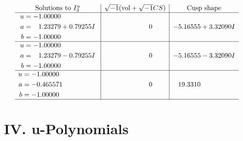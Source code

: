 \documentclass[1p]{elsarticle_modified}
\theoremstyle{definition}
\newcommand{\I}{\sqrt{-1}}
\begin{document}
$$\begin{array}{c|c|c}  
\text{Solutions to }I^u_{3}& \I (\text{vol} + \sqrt{-1}CS) & \text{Cusp shape}\\
 \hline 
\begin{aligned}
u &= -1.00000\phantom{ +0.000000I} \\
a &= \phantom{-}1.23279 + 0.79255 I \\
b &= -1.00000\phantom{ +0.000000I}\end{aligned}
 & \phantom{-0.000000 } 0 & -5.16555 + 3.32090 I \\ \hline\begin{aligned}
u &= -1.00000\phantom{ +0.000000I} \\
a &= \phantom{-}1.23279 - 0.79255 I \\
b &= -1.00000\phantom{ +0.000000I}\end{aligned}
 & \phantom{-0.000000 } 0 & -5.16555 - 3.32090 I \\ \hline\begin{aligned}
u &= -1.00000\phantom{ +0.000000I} \\
a &= -0.465571\phantom{ +0.000000I} \\
b &= -1.00000\phantom{ +0.000000I}\end{aligned}
 & \phantom{-0.000000 } 0 & \phantom{-}19.3310\phantom{ +0.000000I}\\
 \hline 
 \end{array}$$\newpage
\newpage\renewcommand{\arraystretch}{1}
\centering \section*{ IV. u-Polynomials}
\end{document}
